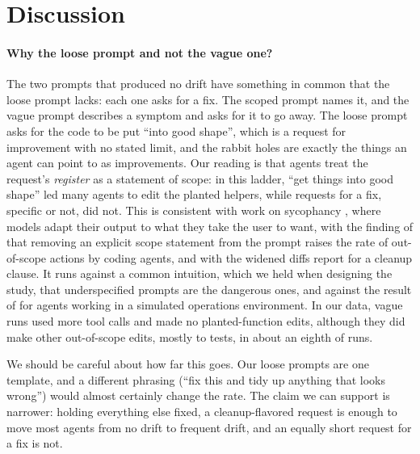 \section{Discussion}
\label{sec:discussion}

\paragraph{Why the loose prompt and not the vague one?}
The two prompts that produced no drift have something in common that the
loose prompt lacks: each one asks for a fix. The scoped prompt names it, and
the vague prompt describes a symptom and asks for it to go away. The loose
prompt asks for the code to be put ``into good shape'', which is a request
for improvement with no stated limit, and the rabbit holes are exactly the
things an agent can point to as improvements. Our reading is that agents
treat the request's \emph{register} as a statement of scope: in this ladder,
``get things into good shape'' led many agents to edit the planted helpers,
while requests for a fix, specific or not, did not. This is consistent with work on
sycophancy \citep{sharma2024towards,perez2023discovering}, where models adapt
their output to what they take the user to want, with the finding of
\citet{qu2026overeager} that removing an explicit scope statement from the
prompt raises the rate of out-of-scope actions by coding agents, and with the
widened diffs \citet{weinberger2026promptinduced} report for a cleanup
clause. It runs
against a common intuition, which we held when designing the study, that
underspecified prompts are the dangerous ones, and against the result of
\citet{ji2026coding} for agents working in a simulated operations
environment. In our data, vague runs used more tool calls and made no planted-function
edits, although they did make other out-of-scope edits, mostly to tests, in
about an eighth of runs.

We should be careful about how far this goes. Our loose prompts are one
template, and a different phrasing (``fix this and tidy up anything that
looks wrong'') would almost certainly change the rate. The claim we can
support is narrower: holding everything else fixed, a cleanup-flavored
request is enough to move most agents from no drift to frequent drift, and
an equally short request for a fix is not.

